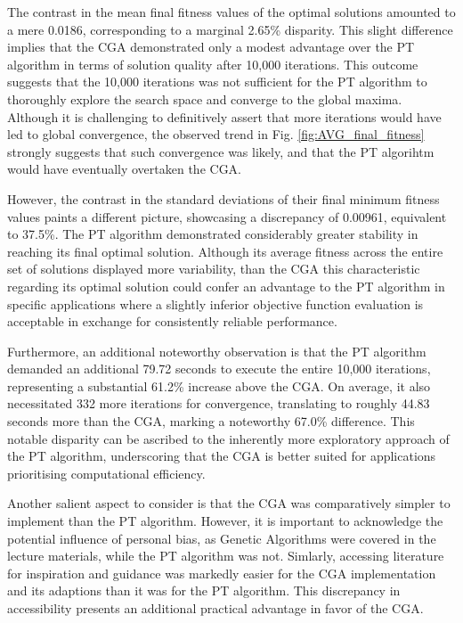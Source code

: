 \documentclass[10pt]{article}
\begin{document}
\begin{multicols}{2}
The contrast in the mean final fitness values of the optimal solutions amounted to a mere 0.0186, corresponding to a marginal 2.65\% disparity. This slight difference implies that the CGA demonstrated only a modest advantage over the PT algorithm in terms of solution quality after 10,000 iterations. This outcome suggests that the 10,000 iterations was not sufficient for the PT algorithm to thoroughly explore the search space and converge to the global maxima. Although it is challenging to definitively assert that more iterations would have led to global convergence, the observed trend in Fig. \ref{fig:AVG_final_fitness} strongly suggests that such convergence was likely, and that the PT algorihtm would have eventually overtaken the CGA.

However, the contrast in the standard deviations of their final minimum fitness values paints a different picture, showcasing a discrepancy of 0.00961, equivalent to 37.5\%. The PT algorithm demonstrated considerably greater stability in reaching its final optimal solution. Although its average fitness across the entire set of solutions displayed more variability, than the CGA this characteristic regarding its optimal solution could confer an advantage to the PT algorithm in specific applications where a slightly inferior objective function evaluation is acceptable in exchange for consistently reliable performance.

Furthermore, an additional noteworthy observation is that the PT algorithm demanded an additional 79.72 seconds to execute the entire 10,000 iterations, representing a substantial 61.2\% increase above the CGA. On average, it also necessitated 332 more iterations for convergence, translating to roughly 44.83 seconds more than the CGA, marking a noteworthy 67.0\% difference. This notable disparity can be ascribed to the inherently more exploratory approach of the PT algorithm, underscoring that the CGA is better suited for applications prioritising computational efficiency.

Another salient aspect to consider is that the CGA was comparatively simpler to implement than the PT algorithm. However, it is important to acknowledge the potential influence of personal bias, as Genetic Algorithms were covered in the lecture materials, while the PT algorithm was not. Simlarly, accessing literature for inspiration and guidance was markedly easier for the CGA implementation and its adaptions than it was for the PT algorithm. This discrepancy in accessibility presents an additional practical advantage in favor of the CGA.


\end{multicols}
\end{document}
